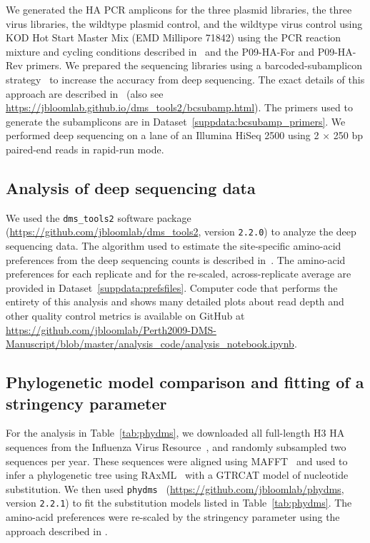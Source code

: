 \documentclass[9pt,twocolumn,twoside]{pnas-new}
\begin{document}
{We generated the HA PCR amplicons for the three plasmid libraries, the three virus libraries, the wildtype plasmid control, and the wildtype virus control using KOD Hot Start Master Mix (EMD Millipore 71842) using the PCR reaction mixture and cycling conditions described in~\cite{bloom2014experimentally} and the P09-HA-For and P09-HA-Rev primers.
We prepared the sequencing libraries using a barcoded-subamplicon strategy~\cite{wu2014high} to increase the accuracy from deep sequencing.
The exact details of this approach are described in~\cite{doud2016accurate} (also see \url{https://jbloomlab.github.io/dms_tools2/bcsubamp.html}).
The primers used to generate the subamplicons are in Dataset~\ref{suppdata:bcsubamp_primers}.
We performed deep sequencing on a lane of an Illumina HiSeq 2500 using 2 $\times$ 250 bp paired-end reads in rapid-run mode.

\subsection*{Analysis of deep sequencing data}
We used the \texttt{dms\_tools2} software package~\cite{bloom2015software} (\url{https://github.com/jbloomlab/dms_tools2}, version \texttt{2.2.0}) to analyze the deep sequencing data.
The algorithm used to estimate the site-specific amino-acid preferences from the deep sequencing counts is described in~\cite{bloom2015software}.
The amino-acid preferences for each replicate and for the re-scaled, across-replicate average are provided in Dataset~\ref{suppdata:prefsfiles}.
Computer code that performs the entirety of this analysis and shows many detailed plots about read depth and other quality control metrics is available on GitHub at \url{https://github.com/jbloomlab/Perth2009-DMS-Manuscript/blob/master/analysis_code/analysis_notebook.ipynb}.

\subsection*{Phylogenetic model comparison and fitting of a stringency parameter}
For the analysis in Table~\ref{tab:phydms}, we downloaded all full-length H3 HA sequences from the Influenza Virus Resource~\cite{bao2008}, and randomly subsampled two sequences per year.
These sequences were aligned using MAFFT~\cite{katoh2013mafft} and used to infer a phylogenetic tree using RAxML~\cite{stamatakis2006raxml} with a GTRCAT model of nucleotide substitution.
We then used \texttt{phydms}~\cite{hilton2017phydms} (\url{https://github.com/jbloomlab/phydms}, version \texttt{2.2.1}) to fit the substitution models listed in Table~\ref{tab:phydms}.
The amino-acid preferences were re-scaled by the stringency parameter using the approach described in \cite{hilton2017phydms}.

}
\end{document}
